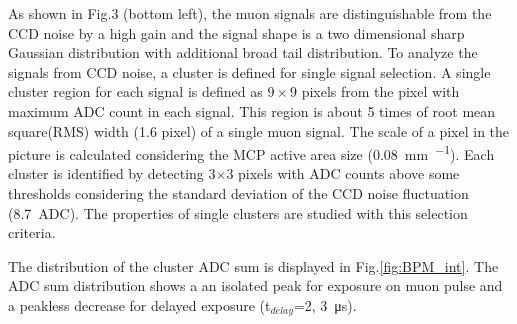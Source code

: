 \documentclass[preprint,3p,twocolumn]{elsarticle}
\begin{document}
As shown in Fig.3 (bottom left), the muon signals are distinguishable from the CCD noise by a high gain and the signal shape is a two dimensional sharp Gaussian distribution with additional broad tail distribution. 
To analyze the signals from CCD noise, a cluster is defined for single signal selection. A single cluster region for each signal is defined as $9\times9$ pixels from the pixel with maximum ADC count in each signal. This region is about 5 times of root mean square(RMS) width (1.6 pixel) of a single muon signal. The scale of a pixel in the picture is calculated considering the MCP active area size (\SI{0.08}{\mm \per \pixel}).
Each cluster is identified by detecting 3$\times$3 pixels with ADC counts above some thresholds considering the standard deviation of the CCD noise fluctuation (\SI{8.7}{ADC}). The properties of single clusters are studied with this selection criteria.

The distribution of the cluster ADC sum is displayed in Fig.\ref{fig:BPM_int}.
The ADC sum distribution shows a an isolated peak for exposure on muon pulse and a peakless decrease for delayed exposure (t$_{delay}$={2}, \SI{3}{\micro\s}).
\end{document}
